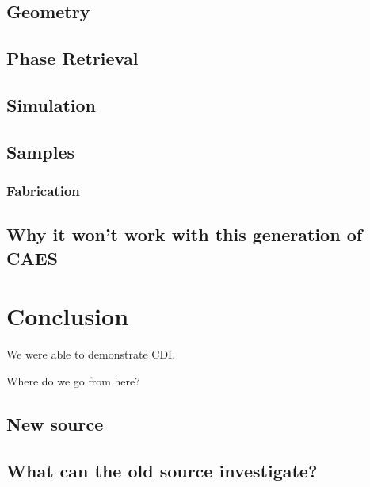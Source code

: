 \section{Geometry}

\section{Phase Retrieval}

\section{Simulation}

\section{Samples}

\subsection{Fabrication}

\section{Why it won't work with this generation of CAES}



\chapter{Conclusion}

We were able to demonstrate CDI.

Where do we go from here?

\section{New source}

\section{What can the old source investigate?}


